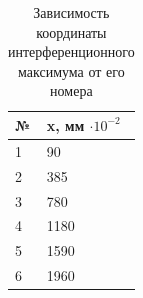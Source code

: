 \begin{table}[H]
    \centering
    \begin{tabular}{|l|l|}
    \hline
        № & x, мм $\cdot 10^{-2}$ \\ \hline
        1 & 90 \\ \hline
        2 & 385 \\ \hline
        3 & 780 \\ \hline
        4 & 1180 \\ \hline
        5 & 1590 \\ \hline
        6 & 1960 \\ \hline
    \end{tabular}
    \caption{Зависимость координаты интерференционного максимума от его номера}
    \label{tab3}
\end{table}